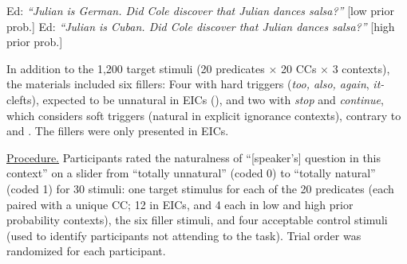 \documentclass[12pt,fleqn]{article}
\newcommand{\6}{\mbox{$[\hspace*{-.6mm}[$}}
\newcommand{\9}{\mbox{$]\hspace*{-.6mm}]$}}
\begin{document}
\vspace*{-.2cm}
\begin{exe}
\ex\label{sample}
\begin{xlist}
\ex Ed: {\em ``Julian is German. Did Cole discover that Julian dances salsa?''} \hspace*{-.2cm} \hfill [low prior prob.]
\ex Ed: {\em ``Julian is Cuban. Did Cole discover that Julian dances salsa?''} \hfill [high prior prob.]
\end{xlist}
\end{exe}
\vspace*{-.2cm}

In addition to the 1,200 target stimuli (20 predicates $\times$ 20 CCs $\times$ 3 contexts), the materials included six fillers: Four with hard triggers ({\em too, also, again},  {\em it-}clefts), expected to be unnatural in EICs (\citealt{simons01,abusch10}), and two with {\em stop} and {\em continue}, which \citealt{simons01} considers soft triggers (natural in explicit ignorance contexts), contrary to \citealt{mandelkern-etal2020} and \citealt{kalomoiros-schwarz2021}. The fillers were only presented in EICs.

\noindent
\underline{Procedure.} Participants rated the naturalness of ``[speaker's] question in this context'' on a slider from ``totally unnatural'' (coded 0) to ``totally natural'' (coded 1) for 30 stimuli: one target stimulus for each of the 20 predicates (each paired with a unique CC; 12 in EICs, and 4 each in low and high prior probability contexts), the six filler stimuli, and four acceptable control stimuli (used to identify participants not attending to the task). Trial order was randomized for each participant.

\end{document}
